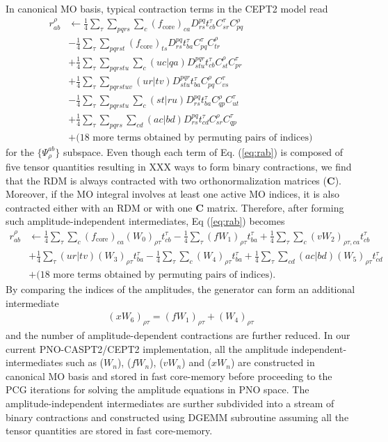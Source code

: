 \documentclass[aip,jcp,amsmath]{revtex4-1}
\begin{document}
%
In canonical MO basis, typical contraction terms in the CEPT2 model read
%
\begin{align}
  r_{ab}^\rho &\leftarrow \frac{1}{4}\sum_\tau\sum_{pqrs}\sum_{c}(f_\text{core})_{ca} D^{pq}_{rs} t_{cb}^\tau C_{sr}^\tau C_{pq}^\rho \nonumber \\
  &-\frac{1}{4}\sum_\tau\sum_{pqrst} (f_\text{core})_{ts} D^{pq}_{rs} t_{ba}^\tau C_{pq}^\tau C_{tr}^\rho \nonumber \\
  &+\frac{1}{4}\sum_\tau\sum_{pqrstu}\sum_c (uc|qa) D^{pqr}_{stu} t_{cb}^\tau C_{st}^\rho C_{pr}^\tau \nonumber \\
  &+\frac{1}{4}\sum_\tau\sum_{pqrstuv} (ur|tv) D^{pqr}_{stu} t_{ba}^\tau C_{pq}^\rho C_{vs}^\tau  \nonumber \\
  &-\frac{1}{4}\sum_\tau\sum_{pqrstu}\sum_c (st|ru) D^{pq}_{rs} t_{ba}^\tau C_{qp}^\rho C_{ut}^\tau \nonumber \\
  &+\frac{1}{4}\sum_\tau\sum_{pqrs}\sum_{cd} (ac|bd) D^{pq}_{rs} t_{cd}^\tau C_{sr}^\rho C_{qp}^\tau \nonumber \\
  &+\text{(18 more terms obtained by permuting pairs of indices)} \label{eq:rab}
\end{align}
%
for the $\{\Psi_{\rho}^{ab}\}$ subspace.
%
Even though each term of Eq. (\ref{eq:rab}) is composed of five tensor quantities resulting in XXX ways to form binary contractions, we find that the RDM is always contracted with two orthonormalization matrices ($\mathbf{C}$).
%
Moreover, if the MO integral involves at least one active MO indices, it is also contracted either with an RDM or with one $\mathbf{C}$ matrix.
%
Therefore, after forming such amplitude-independent intermediates, Eq (\ref{eq:rab}) becomes
%
\begin{align}
  r_{ab}^\rho &\leftarrow \frac{1}{4}\sum_\tau\sum_{c}(f_\text{core})_{ca} (W_0)_{\rho\tau} t_{cb}^\tau - \frac{1}{4}\sum_\tau (fW_1)_{\rho\tau} t_{ba}^\tau +\frac{1}{4}\sum_\tau\sum_c (vW_2)_{\rho\tau,ca} t_{cb}^\tau \nonumber \\
  &+\frac{1}{4}\sum_\tau (ur|tv) (W_3)_{\rho\tau} t_{ba}^\tau-\frac{1}{4}\sum_\tau\sum_c (W_4)_{\rho\tau} t_{ba}^\tau +\frac{1}{4}\sum_\tau\sum_{cd} (ac|bd) (W_5)_{\rho\tau} t_{cd}^\tau \nonumber \\
  &+\text{(18 more terms obtained by permuting pairs of indices)}. \label{eq:rab-2}
\end{align}
%
By comparing the indices of the amplitudes, the generator can form an additional intermediate
%
\begin{align}
  (xW_6)_{\rho\tau}=(fW_1)_{\rho\tau}+(W_4)_{\rho\tau} \label{eq:interm}
\end{align}
%
and the number of amplitude-dependent contractions are further reduced.
%
In our current PNO-CASPT2/CEPT2 implementation, all the amplitude independent-intermediates such as ($W_n$), ($fW_n$), ($vW_n$) and ($xW_n$) are constructed in canonical MO basis and stored in fast core-memory before proceeding to the PCG iterations for solving the amplitude equations in PNO space.
%
The amplitude-independent intermediates are surther subdivided into a stream of binary contractions and constructed using DGEMM subroutine assuming all the tensor quantities are stored in fast core-memory.
\end{document}
